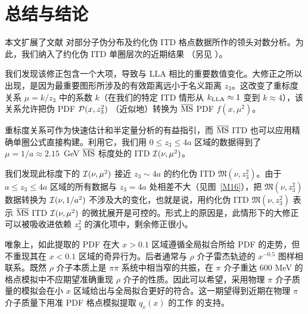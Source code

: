 \section{总结与结论}

本文扩展了文献 \cite{Orginos:2017kos} 对部分子伪分布及约化伪 ITD 格点数据所作的领头对数分析。为此，我们纳入了约化伪 ITD 单圈层次的近期结果 \cite{Radyushkin:2017lvu}（另见 \cite{Ji:2017rah,Izubuchi:2018srq}）。

我们发现该修正包含一个大项，导致与 LLA 相比的重要数值变化。大修正之所以出现，是因为最重要图形所涉及的有效距离远小于名义距离 $z_3$。这改变了重标度关系 $\mu = k/z_3$ 中的系数 $k$（在我们的特定 ITD 情形从 $k_{\rm LLA} \approx 1$ 变到 $k \approx 4$），该关系允许把伪 PDF ${\cal P} (x,z_3^2)$ （近似地）转换为 $\overline{\rm MS}$ PDF $f(x,\mu^2)$。

重标度关系可作为快速估计和半定量分析的有益指引，而 $\overline{\rm MS}$ ITD 也可以应用精确单圈公式直接构建。利用它，我们用 \mbox{$0\leq z_3 \leq 4a$} 区域的数据得到了 \mbox{$\mu=1/a \approx 2.15$ GeV} $\overline{\rm MS}$ 标度处的 ITD ${\cal I} (\nu, \mu^2)$。

我们发现此标度下的 ${\cal I} (\nu, \mu^2)$ 接近 $z_3\sim 4a$ 的约化伪 ITD ${\mathfrak M} (\nu,z_3^2)$。由于 $a\leq z_3 \leq 4a$ 区域的所有数据与 $z_3=4a$ 处相差不大（见图~\ref{M16}），把 ${\mathfrak M} (\nu,z_3^2)$ 数据转换为 ${\cal I} (\nu, 1/a^2)$ 不涉及大的变化，也就是说，用约化伪 ITD ${\mathfrak M} (\nu,z_3^2)$ 表示 $\overline{\rm MS}$ ITD ${\cal I} (\nu, \mu^2)$ 的微扰展开是可控的。形式上的原因是，此情形下的大修正可以被吸收进依赖 $z_3^2$ 的演化项中，剩余修正很小。

唯象上，如此提取的 PDF 在大 $x>0.1$ 区域遵循全局拟合所给 PDF 的走势，但不重现其在 $x<0.1$ 区域的奇异行为。后者通常与 $\rho$ 介子雷杰轨迹的 $x^{-0.5}$ 图样相联系。既然 $\rho$ 介子本质上是 $\pi \pi$ 系统中相当窄的共振，在 $\pi$ 介子重达 600 MeV 的格点模拟中不应期望准确重现 $\rho$ 介子的性质。因此可以希望，采用物理 $\pi$ 介子质量的模拟会在小 $x$ 区域给出与全局拟合更好的符合。这一期望得到近期在物理 $\pi$ 介子质量下用准 PDF 格点模拟提取 $q_v (x)$ 的工作 \cite{Alexandrou:2018pbm,Chen:2018xof} 的支持。
